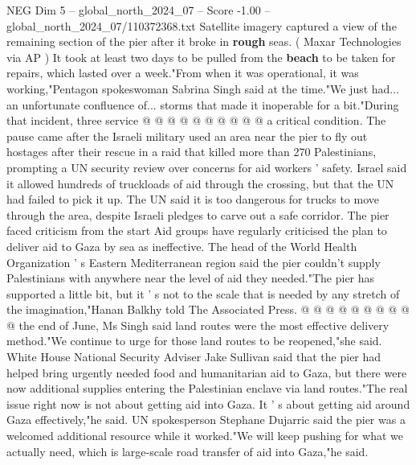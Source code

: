 \begin{textsample}{NEG Dim 5 – global\_north\_2024\_07 – Score -1.00 – global\_north\_2024\_07/110372368.txt}
Satellite imagery captured a view of the remaining section of the pier after it broke in \textbf{rough} seas. ( Maxar Technologies via AP ) It took at least two days to be pulled from the \textbf{beach} to be taken for repairs, which lasted over a week."From when it was operational, it was working,"Pentagon spokeswoman Sabrina Singh said at the time."We just had... an unfortunate confluence of... storms that made it inoperable for a bit."During that incident, three service @ @ @ @ @ @ @ @ @ @ a critical condition.
The pause came after the Israeli military used an area near the pier to fly out hostages after their rescue in a raid that killed more than 270 Palestinians, prompting a UN security review over concerns for aid workers ' safety.
Israel said it allowed hundreds of truckloads of aid through the crossing, but that the UN had failed to pick it up.
The UN said it is too dangerous for trucks to move through the area, despite Israeli pledges to carve out a safe corridor.
The pier faced criticism from the start Aid groups have regularly criticised the plan to deliver aid to Gaza by sea as ineffective.
The head of the World Health Organization ' s Eastern Mediterranean region said the pier couldn't supply Palestinians with anywhere near the level of aid they needed."The pier has supported a little bit, but it ' s not to the scale that is needed by any stretch of the imagination,"Hanan Balkhy told The Associated Press. @ @ @ @ @ @ @ @ @ @ the end of June, Ms Singh said land routes were the most effective delivery method."We continue to urge for those land routes to be reopened,"she said.
White House National Security Adviser Jake Sullivan said that the pier had helped bring urgently needed food and humanitarian aid to Gaza, but there were now additional supplies entering the Palestinian enclave via land routes."The real issue right now is not about getting aid into Gaza.
It ' s about getting aid around Gaza effectively,"he said.
UN spokesperson Stephane Dujarric said the pier was a welcomed additional resource while it worked."We will keep pushing for what we actually need, which is large-scale road transfer of aid into Gaza,"he said.

\end{textsample}
